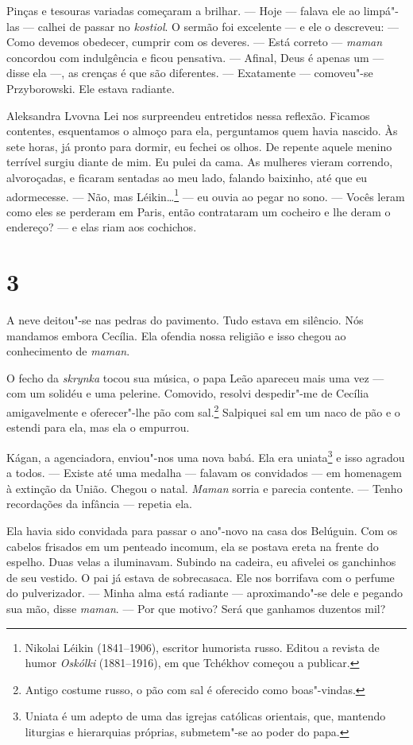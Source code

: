 Pinças e tesouras variadas começaram a brilhar. --- Hoje --- falava ele
ao limpá"-las --- calhei de passar no \emph{kostiol}. O sermão foi
excelente --- e ele o descreveu: --- Como devemos obedecer, cumprir com
os deveres. --- Está correto --- \emph{maman} concordou com indulgência
e ficou pensativa. --- Afinal, Deus é apenas um --- disse ela ---, as
crenças é que são diferentes. --- Exatamente --- comoveu"-se
Przyborowski. Ele estava radiante.

Aleksandra Lvovna Lei nos surpreendeu entretidos nessa reflexão. Ficamos
contentes, esquentamos o almoço para ela, perguntamos quem havia
nascido. Às sete horas, já pronto para dormir, eu fechei os olhos. De
repente aquele menino terrível surgiu diante de mim. Eu pulei da cama.
As mulheres vieram correndo, alvoroçadas, e ficaram sentadas ao meu
lado, falando baixinho, até que eu adormecesse. --- Não, mas
Léikin\ldots{}\footnote{Nikolai Léikin (1841--1906), escritor humorista
  russo. Editou a revista de humor \emph{Oskólki} (1881--1916), em
  que Tchékhov começou a publicar.} --- eu ouvia ao pegar no sono. ---
Vocês leram como eles se perderam em Paris, então contrataram um
cocheiro e lhe deram o endereço? --- e elas riam aos cochichos.

\section{3}

A neve deitou"-se nas pedras do pavimento. Tudo estava em silêncio. Nós
mandamos embora Cecília. Ela ofendia nossa religião e isso chegou ao
conhecimento de \emph{maman}.

O fecho da \emph{skrynka} tocou sua música, o papa Leão apareceu mais
uma vez --- com um solidéu e uma pelerine. Comovido, resolvi despedir"-me
de Cecília amigavelmente e oferecer"-lhe pão com sal.\footnote{Antigo
  costume russo, o pão com sal é oferecido como boas"-vindas.} Salpiquei
sal em um naco de pão e o estendi para ela, mas ela o empurrou.

Kágan, a agenciadora, enviou"-nos uma nova babá. Ela era uniata\footnote{Uniata
  é um adepto de uma das igrejas católicas orientais, que, mantendo
  liturgias e hierarquias próprias, submetem"-se ao poder do papa.} e
isso agradou a todos. --- Existe até uma medalha --- falavam os
convidados --- em homenagem à extinção da União. Chegou o natal.
\emph{Maman} sorria e parecia contente. --- Tenho recordações da
infância --- repetia ela.

Ela havia sido convidada para passar o ano"-novo na casa dos Belúguin.
Com os cabelos frisados em um penteado incomum, ela se postava ereta na
frente do espelho. Duas velas a iluminavam. Subindo na cadeira, eu
afivelei os ganchinhos de seu vestido. O pai já estava de sobrecasaca.
Ele nos borrifava com o perfume do pulverizador. --- Minha alma está
radiante --- aproximando"-se dele e pegando sua mão, disse \emph{maman}.
--- Por que motivo? Será que ganhamos duzentos mil?


